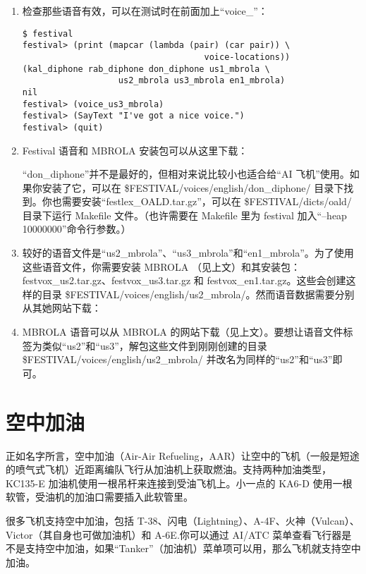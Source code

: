\begin{enumerate}
\item 检查那些语音有效，可以在测试时在前面加上“voice\_”：

\begin{verbatim}
$ festival
festival> (print (mapcar (lambda (pair) (car pair)) \
                                    voice-locations))
(kal_diphone rab_diphone don_diphone us1_mbrola \
                   us2_mbrola us3_mbrola en1_mbrola)
nil
festival> (voice_us3_mbrola)
festival> (SayText "I've got a nice voice.")
festival> (quit)
\end{verbatim}

\item Festival 语音和 MBROLA 安装包可以从这里下载：


“don\_diphone”并不是最好的，但相对来说比较小也适合给“AI 飞机”使用。如果你安装了它，可以在 \$FESTIVAL/voices/english/don\_diphone/ 目录下找到。你也需要安装“festlex\_OALD.tar.gz”，可以在 \$FESTIVAL/dicts/oald/ 目录下运行 Makefile 文件。（也许需要在 Makefile 里为 festival 加入“--heap 10000000”命令行参数。）

\item 较好的语音文件是“us2\_mbrola”、“us3\_mbrola”和“en1\_mbrola”。为了使用这些语音文件，你需要安装 MBROLA （见上文）和其安装包：festvox\_us2.tar.gz、festvox\_us3.tar.gz 和 festvox\_en1.tar.gz。这些会创建这样的目录 \$FESTIVAL/voices/english/us2\_mbrola/。然而语音数据需要分别从其她网站下载：

\item MBROLA 语音可以从 MBROLA 的网站下载（见上文）。要想让语音文件标签为类似“us2”和“us3”，解包这些文件到刚刚创建的目录 \$FESTIVAL/voices/english/us2\_mbrola/ 并改名为同样的“us2”和“us3”即可。

\end{enumerate}

\section{空中加油}\label{aar}

正如名字所言，空中加油（Air-Air Refueling，AAR）让空中的飞机（一般是短途的喷气式飞机）近距离编队飞行从加油机上获取燃油。支持两种加油类型，KC135-E 加油机使用一根吊杆来连接到受油飞机上。小一点的 KA6-D 使用一根软管，受油机的加油口需要插入此软管里。

很多飞机支持空中加油，包括 T-38、闪电（Lightning）、A-4F、火神（Vulcan）、Victor（其自身也可做加油机）和 A-6E.你可以通过 AI/ATC 菜单查看飞行器是不是支持空中加油，如果“Tanker”（加油机）菜单项可以用，那么飞机就支持空中加油。


